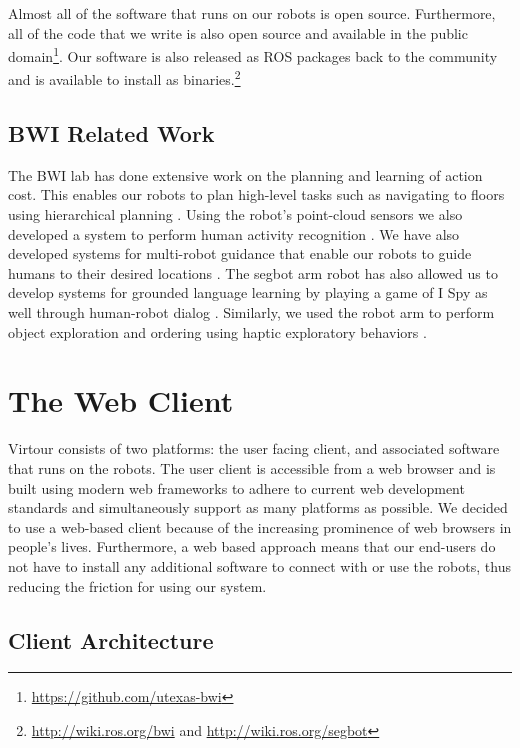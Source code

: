 \documentclass[
  oneside,
  11pt, a4paper,
  footinclude=true,
  headinclude=true,
  cleardoublepage=empty
]{article}
\begin{document}
Almost all of the software that runs on our robots is open source. Furthermore,
all of the code that we write is also open source and available in the public
domain\footnote{\url{https://github.com/utexas-bwi}}. Our software is also
released as ROS packages back to the community and is available to install as
binaries.\footnote{\url{http://wiki.ros.org/bwi} and
\url{http://wiki.ros.org/segbot}}

\subsection{BWI Related Work}

The BWI lab has done extensive work on the planning and learning of action
cost. This enables our robots to plan high-level tasks such as navigating to
floors using hierarchical planning \citep{yang2014, khandelwal2014}. Using the
robot's point-cloud sensors we also developed a system to perform human
activity recognition \citep{gori2015robot}. We have also developed systems for
multi-robot guidance that enable our robots to guide humans to their desired
locations \citep{khandelwal2015, khandelwal2014multi}. The segbot arm robot has
also allowed us to develop systems for grounded language learning by playing a
game of I Spy \citep{thomason2016} as well through human-robot dialog
\citep{thomason2015learning}. Similarly, we used the robot arm to perform
object exploration and ordering using haptic exploratory behaviors
\citep{sinapov2016}.

\section{The Web Client}\label{sec:client}

Virtour consists of two platforms: the user facing client, and associated
software that runs on the robots. The user client is accessible from a web
browser and is built using modern web frameworks to adhere to current web
development standards and simultaneously support as many platforms as possible.
We decided to use a web-based client because of the increasing prominence of
web browsers in people's lives. Furthermore, a web based approach means that
our end-users do not have to install any additional software to connect with or
use the robots, thus reducing the friction for using our system.

\subsection{Client Architecture}
\end{document}
